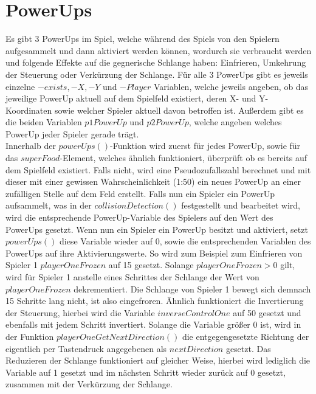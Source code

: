 \section{PowerUps}
\label{PowerUps}
%
Es gibt 3 PowerUps im Spiel, welche während des Spiels von den Spielern aufgesammelt und dann aktiviert werden können, wordurch sie verbraucht werden und folgende Effekte auf die gegnerische Schlange haben: Einfrieren, Umkehrung der Steuerung oder Verkürzung der Schlange. Für alle 3 PowerUps gibt es jeweils einzelne $-exists, -X, -Y$ und $-Player$ Variablen, welche jeweils angeben, ob das jeweilige PowerUp aktuell auf dem Spielfeld existiert, deren X- und Y-Koordinaten sowie welcher Spieler aktuell davon betroffen ist. Außerdem gibt es die beiden Variablen $p1PowerUp$ und $p2PowerUp$, welche angeben welches PowerUp jeder Spieler gerade trägt. \\
Innerhalb der $powerUps()$-Funktion wird zuerst für jedes PowerUp, sowie für das $superFood$-Element, welches ähnlich funktioniert, überprüft ob es bereits auf dem Spielfeld existiert. Falls nicht, wird eine Pseudozufallszahl berechnet und mit dieser mit einer gewissen Wahrscheinlichkeit (1:50) ein neues PowerUp an einer zufälligen Stelle auf dem Feld erstellt. Falls nun ein Spieler ein PowerUp aufsammelt, was in der $collisionDetection()$ festgestellt und bearbeitet wird, wird die entsprechende PowerUp-Variable des Spielers auf den Wert des PowerUps gesetzt. Wenn nun ein Spieler ein PowerUp besitzt und aktiviert, setzt $powerUps()$ diese Variable wieder auf 0, sowie die entsprechenden Variablen des PowerUps auf ihre Aktivierungswerte. So wird zum Beispiel zum Einfrieren von Spieler 1 $playerOneFrozen$ auf 15 gesetzt. Solange $playerOneFrozen > 0$ gilt, wird für Spieler 1 anstelle eines Schrittes der Schlange der Wert von $playerOneFrozen$ dekrementiert. Die Schlange von Spieler 1 bewegt sich demnach 15 Schritte lang nicht, ist also eingefroren. Ähnlich funktioniert die Invertierung der Steuerung, hierbei wird die Variable $inverseControlOne$ auf 50 gesetzt und ebenfalls mit jedem Schritt invertiert. Solange die Variable größer 0 ist, wird in der Funktion $playerOneGetNextDirection()$ die entgegengesetzte Richtung der eigentlich per Tastendruck angegebenen als $nextDirection$ gesetzt. Das Reduzieren der Schlange funktioniert auf gleicher Weise, hierbei wird lediglich die Variable auf 1 gesetzt und im nächsten Schritt wieder zurück auf 0 gesetzt, zusammen mit der Verkürzung der Schlange. 
%
